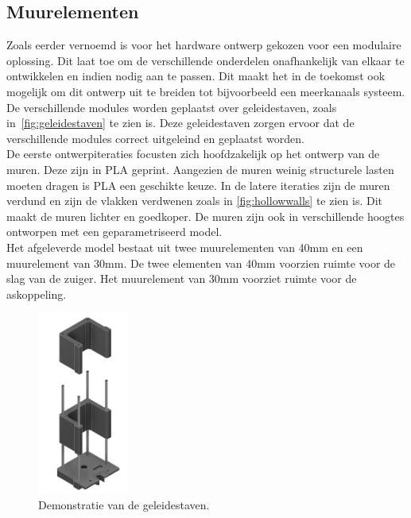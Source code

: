 \subsection{Muurelementen}
Zoals eerder vernoemd is voor het hardware ontwerp gekozen voor een modulaire oplossing. Dit laat toe om de verschillende onderdelen onafhankelijk van elkaar te ontwikkelen en indien nodig aan te passen. Dit maakt het in de toekomst ook mogelijk om dit ontwerp uit te breiden tot bijvoorbeeld een meerkanaals systeem. De verschillende modules worden geplaatst over geleidestaven, zoals in\ \autoref{fig:geleidestaven} te zien is. Deze geleidestaven zorgen ervoor dat de verschillende modules correct uitgeleind en geplaatst worden.
\\[12pt]De eerste ontwerpiteraties focusten zich hoofdzakelijk op het ontwerp van de muren. Deze zijn in PLA geprint. Aangezien de muren weinig structurele lasten moeten dragen is PLA een geschikte keuze. In de latere iteraties zijn de muren verdund en zijn de vlakken verdwenen zoals in \autoref{fig:hollowwalls} te zien is. Dit maakt de muren lichter en goedkoper. De muren zijn ook in verschillende hoogtes ontworpen met een geparametriseerd model. 
\\[12pt]Het afgeleverde model bestaat uit twee muurelementen van 40mm en een muurelement van 30mm. De twee elementen van 40mm voorzien ruimte voor de slag van de zuiger. Het muurelement van 30mm voorziet ruimte voor de askoppeling.
\\[12pt]\begin{minipage}[t]{0.49\textwidth}
    \vspace{0pt}
    \begin{figure}[H]
        \centering
        \includegraphics[height=6cm]{figures/GuidesDemonstration.png}
        \caption{Demonstratie van de geleidestaven.}\label{fig:geleidestaven}
    \end{figure}
\end{minipage}
